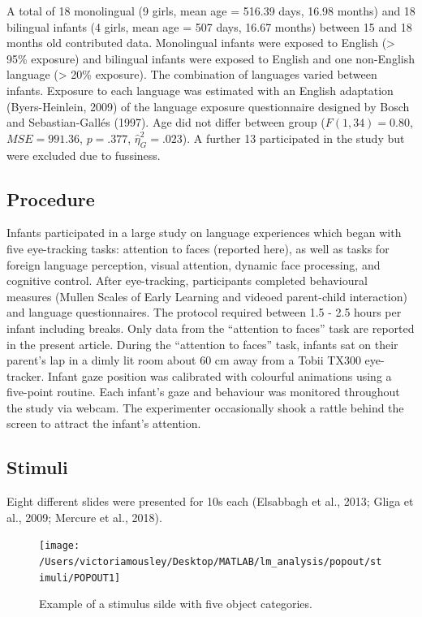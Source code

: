 \documentclass[english,man,floatsintext]{apa6}
\begin{document}
A total of 18 monolingual (9 girls, mean age = 516.39 days, 16.98 months) and 18 bilingual infants (4 girls, mean age = 507 days, 16.67 months) between 15 and 18 months old contributed data. Monolingual infants were exposed to English (\textgreater{} 95\% exposure) and bilingual infants were exposed to English and one non-English language (\textgreater{} 20\% exposure). The combination of languages varied between infants. Exposure to each language was estimated with an English adaptation (Byers-Heinlein, 2009) of the language exposure questionnaire designed by Bosch and Sebastian-Gallés (1997). Age did not differ between group (\(F(1, 34) = 0.80\), \(\mathit{MSE} = 991.36\), \(p = .377\), \(\hat{\eta}^2_G = .023\)). A further 13 participated in the study but were excluded due to fussiness.

\hypertarget{procedure}{%
\subsection{Procedure}\label{procedure}}

Infants participated in a large study on language experiences which began with five eye-tracking tasks: attention to faces (reported here), as well as tasks for foreign language perception, visual attention, dynamic face processing, and cognitive control. After eye-tracking, participants completed behavioural measures (Mullen Scales of Early Learning and videoed parent-child interaction) and language questionnaires. The protocol required between 1.5 - 2.5 hours per infant including breaks. Only data from the \enquote{attention to faces} task are reported in the present article.
During the \enquote{attention to faces} task, infants sat on their parent's lap in a dimly lit room about 60 cm away from a Tobii TX300 eye-tracker. Infant gaze position was calibrated with colourful animations using a five-point routine. Each infant's gaze and behaviour was monitored throughout the study via webcam. The experimenter occasionally shook a rattle behind the screen to attract the infant's attention.

\hypertarget{stimuli}{%
\subsection{Stimuli}\label{stimuli}}

Eight different slides were presented for 10s each (Elsabbagh et al., 2013; Gliga et al., 2009; Mercure et al., 2018).

\begin{figure}

{\centering \texttt{[image: /Users/victoriamousley/Desktop/MATLAB/lm\_analysis/popout/stimuli/POPOUT1]} 

}

\caption{Example of a stimulus silde with five object categories.}\label{fig:taskstim}
\end{figure}
\end{document}
